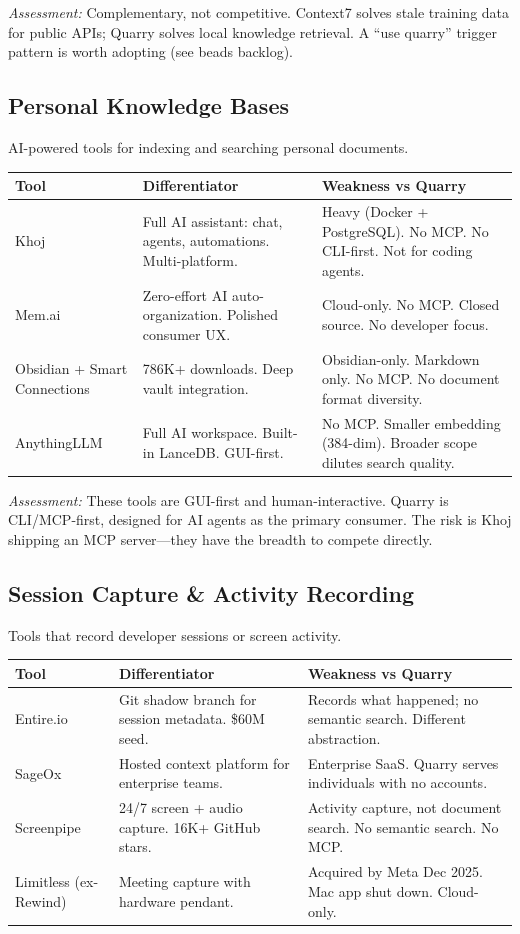 \documentclass[11pt,letterpaper]{article}
\begin{document}
\vspace{0.5em}
\textit{Assessment:} Complementary, not competitive. Context7 solves stale
training data for public APIs; Quarry solves local knowledge retrieval.
A ``use quarry'' trigger pattern is worth adopting (see beads backlog).

\subsection*{Personal Knowledge Bases}

AI-powered tools for indexing and searching personal documents.

\begin{tabularx}{\textwidth}{@{} l X X @{}}
\toprule
\textbf{Tool} & \textbf{Differentiator} & \textbf{Weakness vs Quarry} \\
\midrule
Khoj & Full AI assistant: chat, agents, automations. Multi-platform. & Heavy (Docker + PostgreSQL). No MCP. No CLI-first. Not for coding agents. \\
Mem.ai & Zero-effort AI auto-organization. Polished consumer UX. & Cloud-only. No MCP. Closed source. No developer focus. \\
Obsidian + Smart Connections & 786K+ downloads. Deep vault integration. & Obsidian-only. Markdown only. No MCP. No document format diversity. \\
AnythingLLM & Full AI workspace. Built-in LanceDB. GUI-first. & No MCP. Smaller embedding (384-dim). Broader scope dilutes search quality. \\
\bottomrule
\end{tabularx}

\vspace{0.5em}
\textit{Assessment:} These tools are GUI-first and human-interactive. Quarry is
CLI/MCP-first, designed for AI agents as the primary consumer. The risk is Khoj
shipping an MCP server---they have the breadth to compete directly.

\subsection*{Session Capture \& Activity Recording}

Tools that record developer sessions or screen activity.

\begin{tabularx}{\textwidth}{@{} l X X @{}}
\toprule
\textbf{Tool} & \textbf{Differentiator} & \textbf{Weakness vs Quarry} \\
\midrule
Entire.io & Git shadow branch for session metadata. \$60M seed. & Records what happened; no semantic search. Different abstraction. \\
SageOx & Hosted context platform for enterprise teams. & Enterprise SaaS. Quarry serves individuals with no accounts. \\
Screenpipe & 24/7 screen + audio capture. 16K+ GitHub stars. & Activity capture, not document search. No semantic search. No MCP. \\
Limitless (ex-Rewind) & Meeting capture with hardware pendant. & Acquired by Meta Dec 2025. Mac app shut down. Cloud-only. \\
\bottomrule
\end{tabularx}
\end{document}
